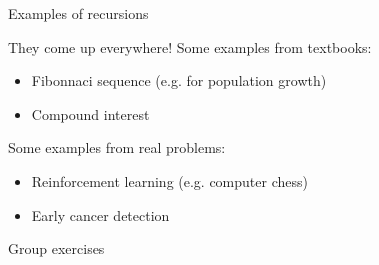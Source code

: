 \documentclass[10pt]{beamer}
\begin{document}
\begin{frame}{Examples of recursions}

They come up everywhere!  
\vfill 
Some examples from textbooks:

\begin{itemize}
\item Fibonnaci sequence (e.g. for population growth)
\item Compound interest
\end{itemize}
\vfill 
Some examples from real problems:
\begin{itemize}
\item Reinforcement learning	 (e.g. computer chess)
\item Early cancer detection
\end{itemize}
\vfill 
\end{frame}


\begin{frame}[standout]
Group exercises
\end{frame}
\end{document}

